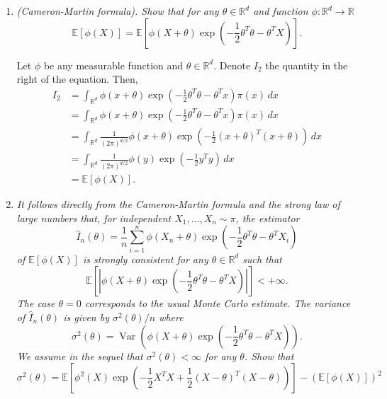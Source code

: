 \documentclass[a4paper,12pt]{article}
\newcommand{\R}{\mathbb{R}}
\newcommand{\var}{\operatorname{Var}}
\newcommand{\ev}{\mathbb{E}}
\theoremstyle{definition}
\begin{document}
\begin{enumerate}
    \item {\it (Cameron-Martin formula). Show that for any $\theta \in  \R^d$ 
    and function $\phi : \R^d \to \R$}
    $$
    \ev[\phi(X)] = \ev\left[\phi(X + \theta) \exp\left(-\frac{1}{2}\theta^T\theta - 
    \theta^TX\right)\right].
    $$

    Let $\phi$ be any measurable function and $\theta \in \R^d$. Denote $I_2$ 
    the quantity in the right of the equation. Then, 
    \begin{equation*}
        \begin{split}
            I_2 &= \int_{\R^d} \phi(x+\theta)\exp\left(-\frac{1}{2}\theta^T\theta - 
    \theta^Tx\right) \pi(x) \, dx \\
        &= \int_{\R^d} \phi(x+\theta)\exp\left(-\frac{1}{2}\theta^T\theta - 
        \theta^Tx\right) \pi(x) \, dx \\
        &= \int_{\R^d} \frac{1}{(2\pi)^{d/2}}\phi(x+\theta)
        \exp\left(-\frac{1}{2}(x + \theta)^T(x+ \theta)\right) \, dx \\
        &= \int_{\R^d} \frac{1}{(2\pi)^{d/2}}\phi(y)
        \exp\left(-\frac{1}{2}y^Ty\right) \, dx \\
        &= \ev[\phi(X)]. 
        \end{split} 
    \end{equation*}

    \item {\it It follows directly from the Cameron-Martin formula 
    and the strong law of large numbers that, for
    independent $X_1 , \dots, X_n \sim \pi$, the estimator}
    $$
    \hat{I}_n(\theta) = \frac{1}{n}\sum_{i=1}^n \phi(X_n + \theta)
    \exp\left(-\frac{1}{2}\theta^T\theta - \theta^TX_i\right)
    $$
    {\it of $\ev[\phi(X)]$ is strongly consistent for any $\theta \in \R^d$ 
    such that}
    $$\ev\left[|\phi(X + \theta) \exp\left(-\frac{1}{2}\theta^T\theta - 
    \theta^TX\right)|\right] < +\infty.$$
    {\it The case $\theta = 0$ corresponds to the usual Monte Carlo 
    estimate. The variance of $\hat{I}_n(\theta)$ is given by 
    $\sigma^2(\theta)/n$ where}
    $$
    \sigma^2(\theta) = \var\left(\phi(X + \theta) \exp\left(-\frac{1}{2}\theta^T\theta - 
    \theta^TX\right)\right).
    $$
    {\it We assume in the sequel that $\sigma^2(\theta) < \infty$ for 
    any $\theta$. Show that}
    $$
    \sigma^2(\theta) = \ev\left[\phi^2(X) \exp\left(-\frac{1}{2}X^TX +
    \frac{1}{2}(X-\theta)^T(X-\theta)\right)\right] - (\ev[\phi(X)])^2
    $$


\end{enumerate}
\end{document}

